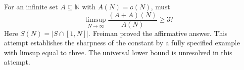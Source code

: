 For an infinite set $A\subseteq\mathbb N$ with $A(N)=o(N)$,
must
\[
 \limsup_{N\to\infty}\frac{(A+A)(N)}{A(N)}\geq3?
\]
Here $S(N)=|S\cap[1,N]|$. Freiman proved the affirmative answer.
This attempt establishes the sharpness of the constant by a
fully specified example with limsup equal to three. The universal
lower bound is unresolved in this attempt.
